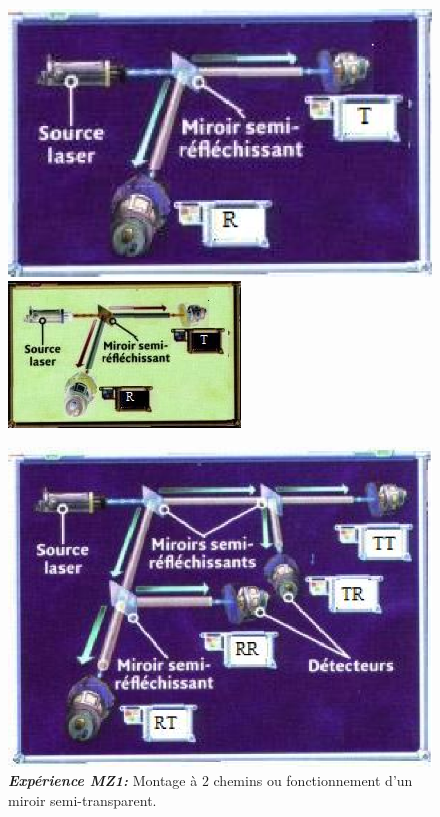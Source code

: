 \begin{figure}[ptbh]
\begin{minipage}[c]{.48\linewidth}
\centering
\ifcase\msipdfoutput
	\includegraphics[scale=1]{graphics/MZ1.eps}%
\else
	\includegraphics[scale=1]{graphics/MZ1.jpg}%
\fi
\caption{\emph{\textbf{Expérience MZ1:}} Montage à $2$ chemins ou fonctionnement
d'un miroir semi-transparent.}
\label{fig:MZ1}%
\end{minipage} \hfill\begin{minipage}[c]{.48\linewidth}
\centering
\ifcase\msipdfoutput
	\includegraphics[scale=.9]{graphics/MZ2.eps}%

\end{minipage}
\end{figure}
